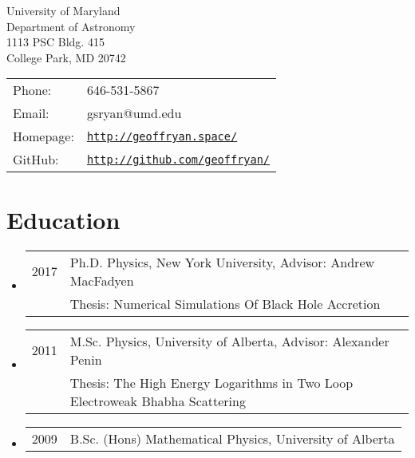 {\huge \name}


\vspace{0.25in}

\begin{minipage}{0.45\linewidth}
  University of Maryland \\
  Department of Astronomy\\
  1113 PSC Bldg. 415\\
  College Park, MD 20742
\end{minipage}
\begin{minipage}{0.45\linewidth}
  \begin{tabular}{ll}
    Phone: & 646-531-5867 \\
    Email: &  gsryan@umd.edu \\
    Homepage: & \href{http://geoffryan.space/}{\tt http://geoffryan.space/} \\
    GitHub: & \href{http://github.com/geoffryan/}{\tt http://github.com/geoffryan/} \\
  \end{tabular}
\end{minipage}

\section*{Education}
\begin{itemize}
\item \begin{tabular}{ll}
2017 & Ph.D. Physics, New York University, Advisor: Andrew MacFadyen \\
	& Thesis: Numerical Simulations Of Black Hole Accretion
\end{tabular}

\item \begin{tabular}{ll}
2011 &  M.Sc. Physics, University of Alberta, Advisor: Alexander Penin \\
	& Thesis: The High Energy Logarithms in Two Loop Electroweak Bhabha Scattering
\end{tabular}

\item \begin{tabular}{ll}
2009 &  B.Sc. (Hons) Mathematical Physics, University of Alberta \\
\end{tabular}
\end{itemize}

